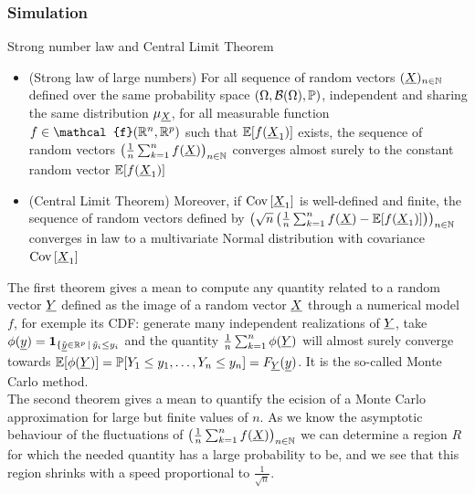 \documentclass[8pt]{beamer}
\begin{document}
\begin{frame}
  \frametitle{Simulation}
  \begin{block}{Strong number law and Central Limit Theorem}
    \begin{itemize}
    \item \alert{(Strong law of large numbers)} For all sequence of random vectors $(\vect{X})_{n\in\N}$ defined over the \alert{same} probability space $(\Omega, \mathcal{B}(\Omega), \P)$, \alert{independent} and \alert{sharing the same distribution $\mu_{\vect{X}}$}, for all measurable function $f\in\mathcal{f}(\R^n,\R^p)$ such that $\E[f(\vect{X}_1)]$ exists, \alert{the sequence of random vectors $\left(\frac{1}{n}\sum_{k=1}^nf(\vect{X})\right)_{n\in\N}$ converges almost surely to the constant random vector $\E[f(\vect{X}_1)]$}
    \item \alert{(Central Limit Theorem)} Moreover, \alert{if $\Cov{\vect{X}_1}$ is well-defined and finite}, the sequence of random vectors defined by \alert{$\left(\sqrt{n}\left(\frac{1}{n}\sum_{k=1}^nf(\vect{X})-\E[f(\vect{X}_1)]\right)\right)_{n\in\N}$ converges in law to a multivariate Normal distribution with covariance $\Cov{\vect{X}_1}$}
    \end{itemize}
    The first theorem gives a mean to compute any quantity related to a random vector $\vect{Y}$ defined as the image of a random vector $\vect{X}$ through a numerical model $f$, for exemple its CDF: generate many independent realizations of $\vect{Y}$, take $\phi(\vect{y})=\mathbf{1}_{\{\tilde{\vect{y}}\in\R^p\,|\,\tilde{y}_i\leq y_i}$ and the quantity $\frac{1}{n}\sum_{k=1}^n\phi(\vect{Y})$ will almost surely converge towards $\E[\phi(\vect{Y})]=\P[Y_1\leq y_1,\dots,Y_n\leq y_n]=F_{\vect{Y}}(\vect{y})$. It is the so-called \alert{Monte Carlo method}.\\
    The second theorem gives a mean to quantify the ecision of a Monte Carlo approximation for large but finite values of $n$. As we know the asymptotic behaviour of the fluctuations of $\left(\frac{1}{n}\sum_{k=1}^nf(\vect{X})\right)_{n\in\N}$ we can determine a region $R$ for which the needed quantity has a large probability to be, and we see that this region shrinks with a speed proportional to $\frac{1}{\sqrt{n}}$.
  \end{block}
\end{frame}
\end{document}
